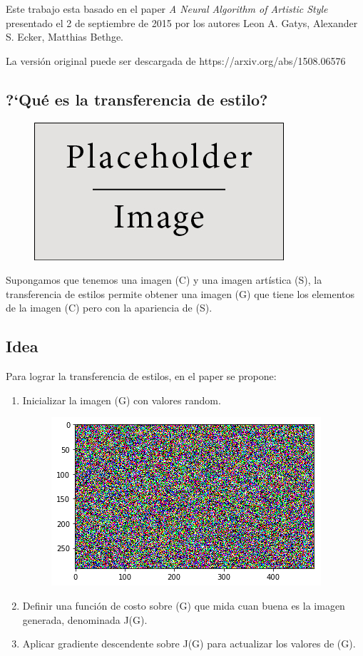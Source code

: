 \documentclass[
paper=128mm:96mm, %
fontsize=11pt, %
pagesize, %
parskip=half-, %
]{scrartcl} %
\newcommand*{\mygreen}[1]{\textcolor{mygreen}{#1}}
\newcommand*{\myblue}[1]{\textcolor{myblue}{#1}}
\newcommand*{\myred}[1]{\textcolor{myred}{#1}}
\theoremstyle{mythmstyle} %
\begin{document}
Este trabajo esta basado en el paper \textit{A Neural Algorithm of Artistic Style} presentado el 2 de septiembre de 2015 por los autores Leon A. Gatys, Alexander S. Ecker, Matthias Bethge.

La versi\'on original puede ser descargada de \myblue{https://arxiv.org/abs/1508.06576}

\clearpage


\subsection{?`Qu\'e es la transferencia de estilo?}

\begin{figure}[h]
\centering\includegraphics[width=0.4\linewidth]{imagenes/placeholder}
\end{figure}

Supongamos que tenemos una imagen \mygreen{(C)} y una imagen art\'istica \mygreen{(S)}, la transferencia de estilos permite obtener una imagen \mygreen{(G)} que tiene los elementos de la imagen \mygreen{(C)} pero con la apariencia de \mygreen{(S)}.


\clearpage



\subsection{Idea}
Para lograr la transferencia de estilos, en el paper se propone:

\begin{enumerate}
\item Inicializar la imagen \mygreen{(G)} con valores random.
	\begin{figure}[h]
		\centering\includegraphics[width=0.2\linewidth]{imagenes/ruido}
	\end{figure}

\item Definir una funci\'on de costo sobre \mygreen{(G)} que mida cuan buena es la imagen generada, denominada \myred{J(G)}.
\item Aplicar gradiente descendente sobre \myred{J(G)} para actualizar los valores de \mygreen{(G)}.
\end{enumerate}
\end{document}
